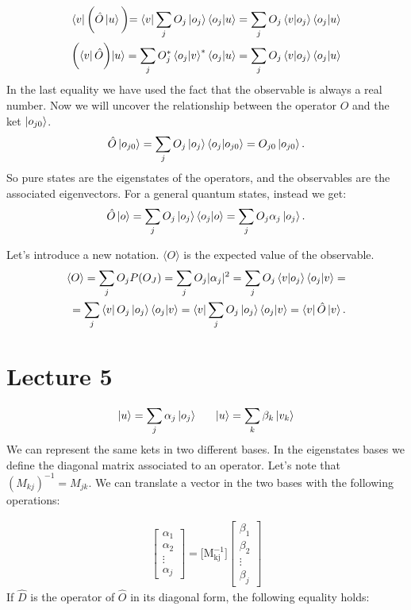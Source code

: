 \documentclass{article}
\begin{document}
\begin{align*} 
\bra{v} \biggl( \hat{O} \ket{u} \biggl) =\bra{v}\sum_j O_j \ket{o_j}\bra{o_j} \ket{u}= \sum_j O_j \bra{v}\ket{o_j}\bra{o_j}\ket{u} \\ 
 \biggl( \bra{v} \hat{O} \biggl) \ket{u} = \sum_j O_j^* \bra{o_j}\ket{v}^* \bra{o_j}\ket{u} = \sum_j O_j \bra{v}\ket{o_j}\bra{o_j}\ket{u}
\end{align*}
In the last equality we have used the fact that the observable is always a real number.
Now we will uncover the relationship between the operator $\hat{O}$ and the ket $\ket{o_{j0}}$.
$$\hat{O} \ket{o_{j0}} = \sum_j O_j \ket{o_j} \bra{o_j}\ket{o_{j0}} = O_{j0} \ket{o_{j0}}.  $$
So pure states are the eigenstates of the operators, and the observables are the associated eigenvectors.
For a general quantum states, instead we get:
$$\hat{O} \ket{o} = \sum_j O_j \ket{o_j} \bra{o_j}\ket{o} = \sum_j O_j \alpha_j \ket{o_j}.$$

Let's introduce a new notation. $\langle O \rangle$ is the expected value of the observable.
\begin{align*}
 \langle O \rangle  = \sum_j O_j P(O_J) = \sum_j O_j  | \alpha_j |^2 = \sum_j O_j \bra{v}\ket{o_j}\bra{o_j}\ket{v} = \\ = \sum_j  \bra{v} O_j \ket{o_j} \bra{o_j}\ket{v} 
 = \bra{v} \sum_j O_j \ket{o_j}\bra{o_j}\ket{v} = \bra{v} \hat{O} \ket{v}.
 \end{align*}

\section{Lecture 5}

$$ \ket{u} = \sum_j \alpha_j \ket{o_j} \ \ \ \ \ \ket{u} = \sum_k \beta_k \ket{v_k} $$
 We can represent the same kets in two different bases. In the eigenstates bases we define the diagonal matrix associated to an operator. Let's note that $(M_{kj})^{-1} = M_{jk}$. We can translate a vector in the two bases with the following operations:
 
   \begin{align*}
    \begin{bmatrix}
           \alpha_1 \\
           \alpha_2  \\
           \vdots \\
           \alpha_j
         \end{bmatrix}  =  \Bigr[ \mathrm{M_{kj}^{-1}} \Bigr] \begin{bmatrix}
             \beta_1 \\
             \beta_2 \\
             \vdots \\
             \beta_j
         \end{bmatrix}
  \end{align*}
If $\hat{D}$ is the operator of $\hat{O}$ in its diagonal form, the following equality holds:
  
\end{document}
